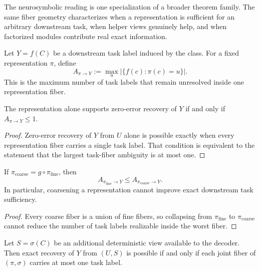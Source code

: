 The neurosymbolic reading is one specialization of a broader theorem family. The same fiber geometry characterizes when a representation is sufficient for an arbitrary downstream task, when helper views genuinely help, and when factorized modules contribute real exact information.

\begin{definition}
Let $Y=f(C)$ be a downstream task label induced by the class. For a fixed representation $\pi$, define
\[
A_{\pi \to Y} := \max_u \left|\{f(c) : \pi(c)=u\}\right|.
\]
This is the maximum number of task labels that remain unresolved inside one representation fiber.
\end{definition}

\begin{theorem}\label{thm:task-sufficiency}
The representation alone supports zero-error recovery of $Y$ if and only if $A_{\pi \to Y} \le 1$.
\end{theorem}

\begin{proof}
Zero-error recovery of $Y$ from $U$ alone is possible exactly when every representation fiber carries a single task label. That condition is equivalent to the statement that the largest task-fiber ambiguity is at most one.
\end{proof}

\begin{corollary}\label{cor:task-coarsening-mono}
If $\pi_{\mathrm{coarse}} = g \circ \pi_{\mathrm{fine}}$, then
\[
A_{\pi_{\mathrm{fine}} \to Y} \le A_{\pi_{\mathrm{coarse}} \to Y}.
\]
In particular, coarsening a representation cannot improve exact downstream task sufficiency.
\end{corollary}

\begin{proof}
Every coarse fiber is a union of fine fibers, so collapsing from $\pi_{\mathrm{fine}}$ to $\pi_{\mathrm{coarse}}$ cannot reduce the number of task labels realizable inside the worst fiber.
\end{proof}

\begin{theorem}\label{thm:helper-view-sufficiency}
Let $S=\sigma(C)$ be an additional deterministic view available to the decoder. Then exact recovery of $Y$ from $(U,S)$ is possible if and only if each joint fiber of $(\pi,\sigma)$ carries at most one task label.
\end{theorem}

